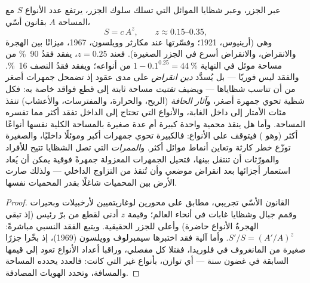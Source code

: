 \begin{proposition}\label{prop:b3:conservation-biology:area}
عبر الجزر، وعبر شظايا الموائل التي تسلك سلوك الجزر،
يرتفع عدد الأنواع $S$ مع المساحة $A$ بقانون أسّي،
\[
S = c\,A^{z}, \qquad z \approx 0.15\text{--}0.35,
\]
وهي \emph{} (أرينيوس، 1921؛ وفسّرتها
 عند مكارثر وويلسون، 1967، ميزانًا بين
الهجرة والانقراض، والانقراض أسرع في الجزر الصغيرة).
فعند $z = 0.25$، يفقد فقدُ \qty{90}{\%} من مساحة موئل في النهاية
$1 - 0.1^{0.25} = \qty{44}{\%}$ من أنواعه؛ ويفقد فقدُ النصف
\qty{16}{\%}. والفقد ليس فوريًا --- بل يُسدَّد \emph{دين انقراض}
على مدى عقود إذ تضمحل جمهرات أصغر من أن تناسب شظاياها
--- ويضيف \emph{تفتيت} مساحة ثابتة إلى قطع فواقد
خاصة به: فكل شظية تحوي جمهرة أصغر، و\emph{آثار الحافة}
(الريح، والحرارة، والمفترسات، والأعشاب) تنفذ مئات الأمتار إلى
داخل الغابة، والأنواع التي تحتاج إلى الداخل تفقد أكثر مما
تفسره المساحة. وأما هل ينقذ محمية واحدة كبيرة أم عدة صغيرة
بالمساحة الكلية نفسها أنواعًا أكثر (وهو \emph{}) فيتوقف
على الأنواع: فالكبيرة تحوي جمهرات أكبر وموئلًا داخليًا،
والصغيرة توزّع خطر كارثة وتعاين
أنماط موائل أكثر. و\emph{الممرات} التي تصل الشظايا تتيح
للأفراد والمورّثات أن تنتقل بينها، فتحيل الجمهرات المعزولة
جمهرةً فوقية يمكن أن يُعاد استعمار أجزائها بعد انقراض
موضعي وأن تُنقذ من التزاوج الداخلي --- ولذلك صارت الأرض
بين المحميات شاغلًا بقدر المحميات نفسها.
\end{proposition}
\begin{proof}
القانون الأسّي تجريبي، مطابق على محورين لوغاريتميين
لأرخبيلات وبحيرات وقمم جبال وشظايا غابات في أنحاء العالم؛ وقيمة
$z$ أدنى لقطع من برّ رئيس (إذ تبقي الهجرةُ الأنواع
حاضرة) وأعلى للجزر الحقيقية. ويتبع الفقد النسبي
مباشرةً: $S'/S = (A'/A)^{z}$. وأما آلية  فقد
اختبرها سيمبرلوف وويلسون (1969)، إذ بخّرا جزرًا صغيرة من
المانغروف في فلوريدا، فقتلا كل مفصلي، وراقبا أعداد
الأنواع تعود إلى قيمها السابقة في غضون سنة --- أي
توازن، بأنواع غير التي كانت: فالعدد يحدده
المساحة والمسافة، وتحدد الهويات المصادفة.
\end{proof}

